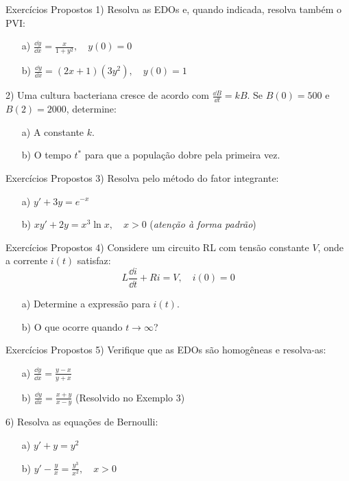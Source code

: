 \documentclass[11pt, aspectratio=169, xcolor=table]{beamer}
\begin{document}
\begin{frame}{Exercícios Propostos}
1) Resolva as EDOs e, quando indicada, resolva também o PVI:
\begin{itemize}
  \item[a)] $\displaystyle \frac{\dd y}{\dd x} = \frac{x}{1+y^2},\quad y(0)=0$
  \item[b)] $\displaystyle \frac{\dd y}{\dd x} = (2x+1)(3y^2),\quad y(0)=1$
\end{itemize}

2) Uma cultura bacteriana cresce de acordo com $\frac{\dd B}{\dd t}=kB$. Se $B(0)=500$ e $B(2)=2000$, determine:
\begin{itemize}
  \item[a)] A constante $k$.
  \item[b)] O tempo $t^*$ para que a população dobre pela primeira vez.
\end{itemize}
\end{frame}

\begin{frame}{Exercícios Propostos}
3) Resolva pelo método do fator integrante:
\begin{itemize}
  \item[a)] $y' + 3y = e^{-x}$
  \item[b)] $xy' + 2y = x^3\ln x,\quad x>0$ (\textit{atenção à forma padrão})
\end{itemize}
\end{frame}

\begin{frame}{Exercícios Propostos}
4) Considere um circuito RL com tensão constante $V$, onde a corrente $i(t)$ satisfaz:
\[
L\frac{\dd i}{\dd t} + Ri = V,\quad i(0)=0
\]
\begin{itemize}
  \item[a)] Determine a expressão para $i(t)$.
  \item[b)] O que ocorre quando $t\to\infty$?
\end{itemize}
\end{frame}

\begin{frame}{Exercícios Propostos}
5) Verifique que as EDOs são homogêneas e resolva-as:
\begin{itemize}
  \item[a)] $\displaystyle \frac{\dd y}{\dd x} = \frac{y-x}{y+x}$
  \item[b)] $\displaystyle \frac{\dd y}{\dd x} = \frac{x+y}{x-y}$ (Resolvido no Exemplo 3)
\end{itemize}

6) Resolva as equações de Bernoulli:
\begin{itemize}
  \item[a)] $y' + y = y^2$
  \item[b)] $\displaystyle y' - \frac{y}{x} = \frac{y^3}{x^2},\quad x>0$
\end{itemize}
\end{frame}
\end{document}
